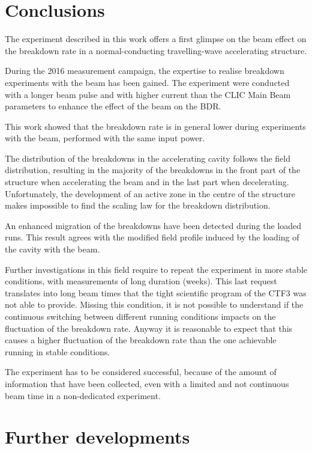\section{Conclusions}

The experiment described in this work offers a first glimpse on the beam effect on the breakdown rate in a normal-conducting travelling-wave accelerating structure.

During the 2016 measurement campaign, the expertise to realise breakdown experiments with the beam has been gained. The experiment were conducted with a longer beam pulse and with higher current than the CLIC Main Beam parameters to enhance the effect of the beam on the BDR.

This work showed that the breakdown rate is in general lower during experiments with the beam, performed with the same input power. 

The distribution of the breakdowns in the accelerating cavity follows the field distribution, resulting in the majority of the breakdowns in the front part of the structure when accelerating the beam and in the last part when decelerating. Unfortunately, the development of an active zone in the centre of the structure makes impossible to find the scaling law for the breakdown distribution. 

An enhanced migration of the breakdowns have been detected during the loaded runs. This result agrees with the modified field profile induced by the loading of the cavity with the beam.

Further investigations in this field require to repeat the experiment in more stable conditions, with measurements of long duration (weeks). This last request translates into long beam times that the tight scientific program of the CTF3 was not able to provide. Missing this condition, it is not possible to understand if the continuous switching between different running conditions impacts on the fluctuation of the breakdown rate. Anyway it is reasonable to expect that this causes a higher fluctuation of the breakdown rate than the one achievable running in stable conditions. 

The experiment has to be considered successful, because of the amount of information that have been collected, even with a limited and not continuous beam time in a non-dedicated experiment.



\section[Further developments]{Further developments}

